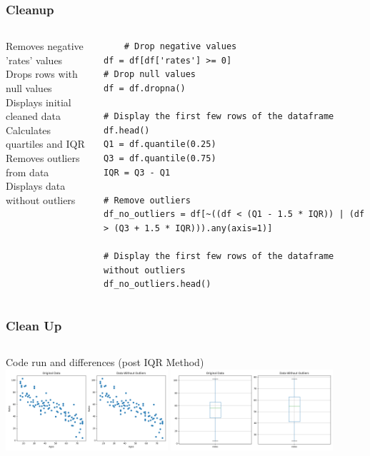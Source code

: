 \documentclass{beamer}
\newcounter{slidenum}
\begin{document}
\begin{frame}[fragile]
	\frametitle{Cleanup}
	\begin{columns}
Removes negative 'rates' values\\
\vspace{.2cm}
Drops rows with null values\\
\vspace{.2cm}
Displays initial cleaned data\\
\vspace{.2cm}
Calculates quartiles and IQR\\
\vspace{.2cm}
Removes outliers from data\\
Displays data without outliers
	\begin{lstlisting}
	# Drop negative values
df = df[df['rates'] >= 0]
# Drop null values
df = df.dropna()

# Display the first few rows of the dataframe
df.head()
Q1 = df.quantile(0.25)
Q3 = df.quantile(0.75)
IQR = Q3 - Q1

# Remove outliers
df_no_outliers = df[~((df < (Q1 - 1.5 * IQR)) | (df > (Q3 + 1.5 * IQR))).any(axis=1)]

# Display the first few rows of the dataframe without outliers
df_no_outliers.head()
	\end{lstlisting}
\end{columns}
\end{frame}

\begin{frame}[fragile]
	\stepcounter{slidenum}
	\frametitle{Clean Up}
	\begin{columns}
	Code run and differences (post IQR Method)
	\includegraphics[height=3cm]{scatter_plots1.png}
	\includegraphics[height=3cm]{scatter_plots3.png}
\end{columns}

	
\end{frame}
\end{document}

